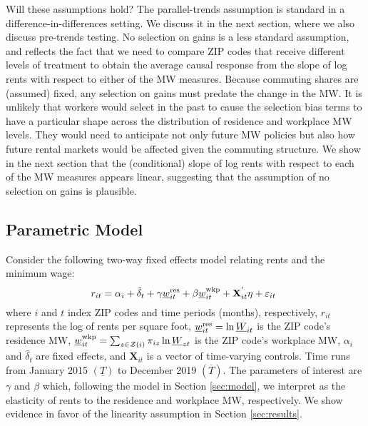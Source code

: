 Will these assumptions hold?
The parallel-trends assumption is standard in a difference-in-differences 
setting.
We discuss it in the next section, where we also discuss pre-trends testing.
No selection on gains is a less standard assumption, and reflects the 
fact that we need to compare ZIP codes that receive different levels 
of treatment to obtain the average causal response from the slope of log 
rents with respect to either of the MW measures.
Because commuting shares are (assumed) fixed, any selection on gains must 
predate the change in the MW.
It is unlikely that workers would select in the past to cause the 
selection bias terms to have a particular shape across the distribution 
of residence and workplace MW levels.
They would need to anticipate not only future MW policies but also how 
future rental markets would be affected given the commuting structure.
We show in the next section that the (conditional) slope of log rents with 
respect to each of the MW measures appears linear, suggesting that the 
assumption of no selection on gains is plausible.

\subsection{Parametric Model}

Consider the following two-way fixed effects model relating rents and the 
minimum wage:
\begin{equation} \label{eq:func_form}
    r_{it} = \alpha_i + \tilde{\delta}_t 
           + \gamma \underline{w}^{\text{res}}_{it} + \beta \underline{w}^{\text{wkp}}_{it}
           + \mathbf{X}^{'}_{it}\eta
           + \varepsilon_{it} \ 
\end{equation}    
where
$i$ and $t$ index ZIP codes and time periods (months), respectively,
$r_{it}$ represents the log of rents per square foot,
$\underline{w}^{\text{res}}_{it} = \ln \underline{W}_{it}$ is the ZIP code's residence MW,
$\underline{w}^{\text{wkp}}_{it} = \sum_{z\in\mathcal{Z}(i)} \pi_{iz}\ln \underline{W}_{zt}$ is the ZIP code's 
workplace MW,
$\alpha_i$ and $\hat{\delta}_t$ are fixed effects, and 
$\mathbf{X}_{it}$ is a vector of time-varying controls.
Time runs from January 2015 $\left(\underline{T}\right)$ 
to December 2019 $\left(\overline{T}\right)$.
The parameters of interest are $\gamma$ and $\beta$ which, 
following the model in Section \ref{sec:model}, 
we interpret as the elasticity of rents to the residence and workplace MW, 
respectively.
We show evidence in favor of the linearity assumption in Section \ref{sec:results}.

